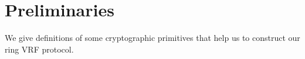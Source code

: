 \newcommand{\com}{\mathsf{Com}}
\newcommand{\open}{\mathsf{Open}}
\newcommand{\commit}{\mathsf{Commit}}
\newcommand{\NARK}{\mathsf{NARK}}
\section{Preliminaries} %
\label{sec:background}

We   give definitions of some cryptographic primitives that help us to construct our ring VRF protocol.




